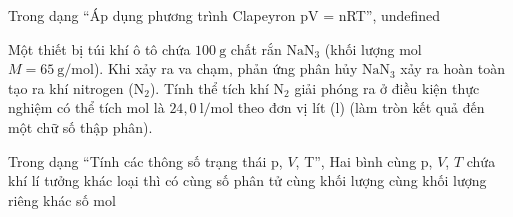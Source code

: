 \begin{bt}
Trong dạng “Áp dụng phương trình Clapeyron pV = nRT”, undefined
\end{bt}

\begin{ex}
	Một thiết bị túi khí ô tô chứa $100\ \mathrm{g}$ chất rắn $\mathrm{NaN_3}$ (khối lượng mol $M = 65\ \mathrm{g/mol}$). Khi xảy ra va chạm, phản ứng phân hủy $\mathrm{NaN_3}$ xảy ra hoàn toàn tạo ra khí nitrogen ($\mathrm{N_2}$). Tính thể tích khí $\mathrm{N_2}$ giải phóng ra ở điều kiện thực nghiệm có thể tích mol là $24,0\ \mathrm{l/mol}$ theo đơn vị lít ($\mathrm{l}$) (làm tròn kết quả đến một chữ số thập phân).
\end{ex}

\begin{ex}
Trong dạng “Tính các thông số trạng thái p, $V$, T”, Hai bình cùng p, $V$, $T$ chứa khí lí tưởng khác loại thì có
\choice
{\True cùng số phân tử}
{cùng khối lượng}
{cùng khối lượng riêng}
{khác số mol}
\end{ex}

